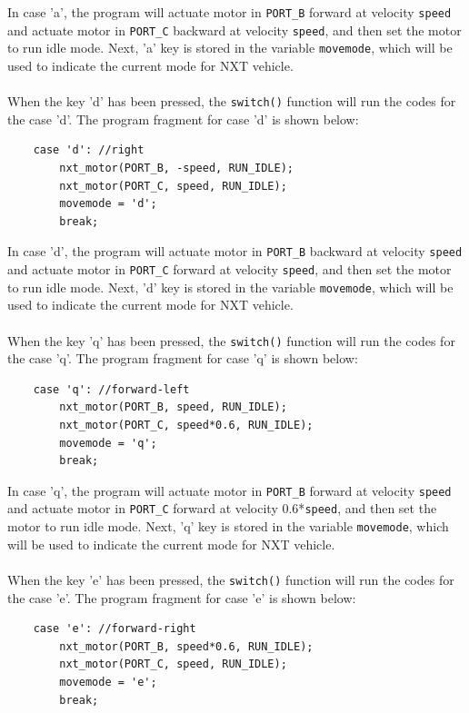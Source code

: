 \documentclass[12pt]{article}
\begin{document}
In case 'a', the program will actuate motor in \verb+PORT_B+ forward at velocity \verb+speed+ and 
actuate motor in     \verb+PORT_C+ backward at velocity \verb+speed+, and then set the motor to 
run idle mode. Next, 'a' key is stored in the variable \verb+movemode+, which will be used to 
indicate the current mode for NXT vehicle.
\\ \\
\noindent
When the key 'd' has been pressed, the \verb+switch()+ function will run the codes for the case 'd'.
The program fragment for case 'd' is shown below:
\begin{verbatim} 
    case 'd': //right
        nxt_motor(PORT_B, -speed, RUN_IDLE);
        nxt_motor(PORT_C, speed, RUN_IDLE);
        movemode = 'd';
        break;
\end{verbatim}
In case 'd', the program will actuate motor in \verb+PORT_B+ backward at velocity \verb+speed+ 
and actuate motor in \verb+PORT_C+ forward at velocity \verb+speed+, and then set the motor to run 
idle mode. Next, 'd' key is stored in the variable \verb+movemode+, which will be used to indicate 
the current mode for NXT vehicle.
\\ \\
\noindent
When the key 'q' has been pressed, the \verb+switch()+ function will run the codes for the case 'q'.
The program fragment for case 'q' is shown below:
\begin{verbatim} 
    case 'q': //forward-left
        nxt_motor(PORT_B, speed, RUN_IDLE);
        nxt_motor(PORT_C, speed*0.6, RUN_IDLE);
        movemode = 'q';
        break;
\end{verbatim}
In case 'q', the program will actuate motor in \verb+PORT_B+ forward at velocity \verb+speed+ and 
actuate motor in \verb+PORT_C+ forward at velocity 0.6*\verb+speed+, and then set the motor to run 
idle mode. Next, 'q' key is stored in the variable \verb+movemode+, which will be used to indicate 
the current mode for NXT vehicle.
\\ \\
\noindent 
When the key 'e' has been pressed, the \verb+switch()+ function will run the codes for the case 'e'.
The program fragment for case 'e' is shown below:
\begin{verbatim} 
    case 'e': //forward-right
        nxt_motor(PORT_B, speed*0.6, RUN_IDLE);
        nxt_motor(PORT_C, speed, RUN_IDLE);
        movemode = 'e';
        break;
\end{verbatim}
\end{document}
